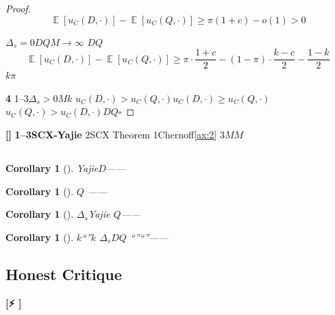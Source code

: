 \documentclass[11pt,a4paper]{article}
\newtheorem{corollary}[theorem]{Corollary}
\theoremstyle{remark}
\DeclareMathOperator{\E}{\mathbb{E}}
\newcommand{\rigorous}{\textnormal{\textbf{[]}}}
\newcommand{\honestwarning}{\textnormal{\textbf{[⚡ ]}}}
\begin{document}
\begin{proof}
\begin{equation}
    \E[u_C(D, \cdot)] - \E[u_C(Q, \cdot)]
    \geq \pi(1 + c) - o(1) > 0
\end{equation}

$\Delta_s = 0$$D$$Q$$M \to \infty$
$D$$Q$
\begin{equation}
    \E[u_C(D, \cdot)] - \E[u_C(Q, \cdot)]
    \geq \pi \cdot \frac{1+c}{2} - (1-\pi) \cdot \frac{k-c}{2} - \frac{1-k}{2}
\end{equation}
$k$$\pi$


\textbf{4}
1--3$\Delta_s > 0$$M$$k$
$u_C(D, \cdot) > u_C(Q, \cdot)$$u_C(D, \cdot) \geq u_C(Q, \cdot)$
$u_C(Q, \cdot) > u_C(D, \cdot)$$D$$Q$\hfill $\square$
\end{proof}

\rigorous{} \textbf{1--3SCX-Yajie}
2SCX Theorem 1Chernoff\ref{ax:2}
3$M$$M$


\subsection{}

\begin{corollary}[]
\label{cor:burden}
Yajie$D$——
\textbf{}
\end{corollary}

\begin{corollary}[]
\label{cor:silence}
$Q$
\textbf{}——

\end{corollary}

\begin{corollary}[]
\label{cor:unverifiable}
$\Delta_s$Yajie
$Q$——
\textbf{}
\end{corollary}

\begin{corollary}[]
\label{cor:deterrence}
$k$``''$k$
$\Delta_s$$D$$Q$
``''``''——\textbf{
}
\end{corollary}

\subsection{Honest Critique}

\honestwarning{} \textbf{}
\end{document}
